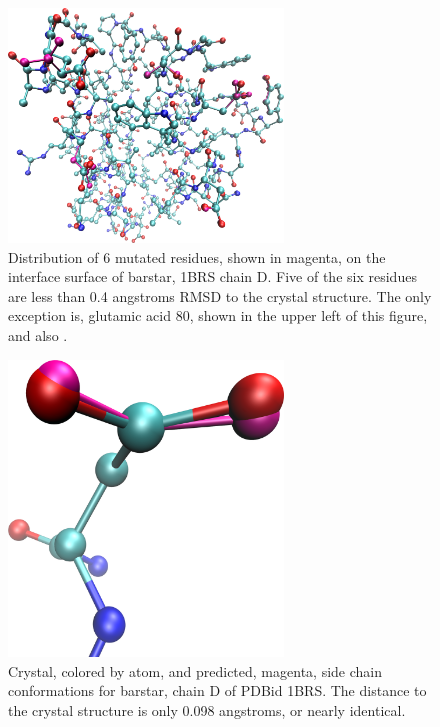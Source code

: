 


\begin{figure}[h]
    \centering
    \includegraphics[width=0.65\textwidth,height=0.3\textheight,keepaspectratio]{figures/mutation_side_chain_images/1brs_all.png}
    \caption{Distribution of 6 mutated residues, shown in magenta, on the interface surface of barstar, 1BRS chain D.
    Five of the six residues are less than 0.4 angstroms RMSD to the crystal structure.
    The only exception is, glutamic acid 80, shown in the upper left of this figure, and also \protect\cite{figure:computational_mutation_scanning/1brs_d_80}.}
    \label{figure:computational_mutation_scanning/figname}
\end{figure}

\begin{figure}[h]
    \centering
    \includegraphics[width=0.65\textwidth,height=0.3\textheight,keepaspectratio]{figures/mutation_side_chain_images/1brs_chain_d_35.png}
    \caption{Crystal, colored by atom, and predicted, magenta, side chain conformations for barstar, chain D of PDBid 1BRS.
    The distance to the crystal structure is only 0.098 angstroms, or nearly identical.}
    \label{figure:computational_mutation_scanning/figname}
\end{figure}

